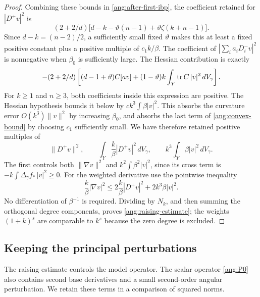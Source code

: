 \begin{proof}
Combining these bounds in \eqref{ang:after-first-ibp}, the coefficient
retained for $|D^+v|^2$ is
\begin{equation}\label{ang:positive-degree-factor}
 (2+2/d)\bigl[d-k-\vartheta(n-1)
                         +\vartheta\zeta(k+n-1)\bigr].
\end{equation}
Since $d-k=(n-2)/2$, a sufficiently small fixed $\vartheta$ makes this
at least a fixed positive constant plus a positive multiple of
$c_1k/\beta$.  The coefficient of
$|\sum_i a_iD_i^-v|^2$ is nonnegative when $\beta_0$ is sufficiently
large.  The Hessian contribution is exactly
\begin{equation}\label{ang:hessian-contribution}
 -(2+2/d)\left[(d-1+\vartheta)C[av]
       +(1-\vartheta)k\int_Y\operatorname{tr} C\,|v|^2\,dV_\gamma\right].
\end{equation}
For $k\ge1$ and $n\ge3$, both coefficients inside this expression are
positive.  The Hessian hypothesis bounds it below by
$c k^3\int\beta|v|^2$.  This absorbs the curvature error $O(k^3)\|v\|^2$
by increasing $\beta_0$, and absorbs the last term of
\eqref{ang:convex-bound} by choosing $c_1$ sufficiently small.
We have therefore retained positive multiples of
\[
 \|D^+v\|^2,\qquad
 \int_Y\frac{k}{\beta}|D^+v|^2\,dV_\gamma,
 \qquad k^3\int_Y\beta|v|^2\,dV_\gamma.
\]
The first controls both $\|\nabla v\|^2$ and
$k^2\int\beta^2|v|^2$, since its cross term is
$-k\int\Delta_\gamma f_*\,|v|^2\ge0$.  For the weighted derivative use the
pointwise inequality
\[
 \frac{k}{\beta}|\nabla v|^2
 \le2\frac{k}{\beta}|D^+v|^2+2k^3\beta|v|^2.
\]
No differentiation of $\beta^{-1}$ is required.  Dividing by $N_k$, and
then summing the orthogonal degree components, proves
\eqref{ang:raising-estimate}; the weights $(1+k)^s$ are comparable
to $k^s$ because the zero degree is excluded.
\end{proof}

\subsection{Keeping the principal perturbations}

The raising estimate controls the model operator.  The scalar operator
\eqref{ang:P0} also contains second base derivatives and a
small second-order angular perturbation.  We retain these terms in a
comparison of squared norms.

